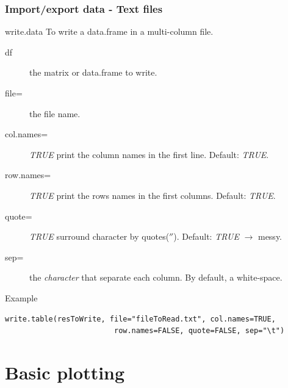 \documentclass[10pt]{beamer}
\newenvironment{xframe}[2][]
  {\begin{frame}[fragile,environment=xframe,#1]
  \frametitle{#2}}
  {\end{frame}}
\begin{document}
\begin{xframe}[shrink=10]{Import/export data - Text files}
  \begin{block}{{\sf write.data}}
    To write a {\sf data.frame} in a multi-column file.
    \begin{description}
    \item[df] the {\sf matrix} or {\sf data.frame} to write.
    \item[file=] the file name.
    \item[col.names=] {\it TRUE} print the column names in the first line. Default: {\it TRUE}.
    \item[row.names=] {\it TRUE} print the rows names in the first columns. Default: {\it TRUE}.
    \item[quote=] {\it TRUE} surround {\sf character} by quotes($''$). Default: {\it TRUE} $\rightarrow$ messy. 
    \item[sep=] the {\it character} that separate each column. By default, a white-space.
    \end{description}
  \end{block}
  \begin{exampleblock}{Example}
\begin{verbatim}
write.table(resToWrite, file="fileToRead.txt", col.names=TRUE, 
                         row.names=FALSE, quote=FALSE, sep="\t")
\end{verbatim}  
  \end{exampleblock}
\end{xframe}

\section{Basic plotting}
\end{document}
